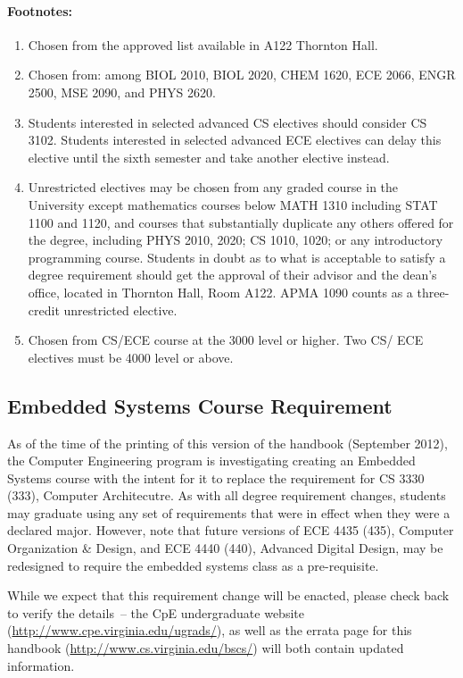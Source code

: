 \documentclass[10pt,letter]{book}
\newenvironment{numlist}{
\begin{enumerate}
\setlength{\itemsep}{0pt}
\setlength{\parskip}{0pt}}
{\end{enumerate}}
\begin{document}
\paragraph{Footnotes:}

\begin{numlist}
\item Chosen from the approved list available in A122 Thornton Hall.
\item Chosen from: among BIOL 2010, BIOL 2020, CHEM 1620, ECE 2066, ENGR
  2500, MSE 2090, and PHYS 2620.
\item Students interested in selected advanced CS electives should
  consider CS 3102.  Students interested in selected advanced ECE
  electives can delay this elective until the sixth semester and take
  another elective instead.
\item Unrestricted electives may be chosen from any graded course in
  the University except mathematics courses below MATH 1310 including
  STAT 1100 and 1120, and courses that substantially duplicate any
  others offered for the degree, including PHYS 2010, 2020; CS 1010,
  1020; or any introductory programming course. Students in doubt as
  to what is acceptable to satisfy a degree requirement should get the
  approval of their advisor and the dean's office, located in Thornton
  Hall, Room A122. APMA 1090 counts as a three-credit unrestricted
  elective.
\item Chosen from CS/ECE course at the 3000 level or higher. Two
  CS/ ECE electives must be 4000 level or above.
\end{numlist}

\subsection{Embedded Systems Course Requirement}
\label{embedded}

As of the time of the printing of this version of the handbook
(September 2012), the Computer Engineering program is investigating
creating an Embedded Systems course with the intent for it to replace
the requirement for CS 3330 (333), Computer Architecutre.  As with all
degree requirement changes, students may graduate using any set of
requirements that were in effect when they were a declared major.
However, note that future versions of ECE 4435 (435), Computer
Organization \& Design, and ECE 4440 (440), Advanced Digital Design,
may be redesigned to require the embedded systems class as a
pre-requisite.

While we expect that this requirement change will be enacted, please
check back to verify the details~-- the CpE undergraduate website
(\url{http://www.cpe.virginia.edu/ugrads/}), as well as the errata
page for this handbook (\url{http://www.cs.virginia.edu/bscs/}) will
both contain updated information.
\end{document}

